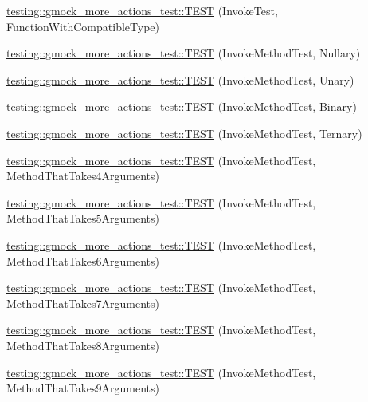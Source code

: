 \begin{DoxyCompactItemize}
\item 
\hyperlink{namespacetesting_1_1gmock__more__actions__test_af9dfd7f1d4186ee4de2d9871a19dba5a}{testing\+::gmock\+\_\+more\+\_\+actions\+\_\+test\+::\+T\+E\+ST} (Invoke\+Test, Function\+With\+Compatible\+Type)
\item 
\hyperlink{namespacetesting_1_1gmock__more__actions__test_abb046fd809977722720c9ce63afd7af5}{testing\+::gmock\+\_\+more\+\_\+actions\+\_\+test\+::\+T\+E\+ST} (Invoke\+Method\+Test, Nullary)
\item 
\hyperlink{namespacetesting_1_1gmock__more__actions__test_a386ce48f1f0a49e2b94a16deeffc2084}{testing\+::gmock\+\_\+more\+\_\+actions\+\_\+test\+::\+T\+E\+ST} (Invoke\+Method\+Test, Unary)
\item 
\hyperlink{namespacetesting_1_1gmock__more__actions__test_a86221fa7d09853358e38c01b0d6ceced}{testing\+::gmock\+\_\+more\+\_\+actions\+\_\+test\+::\+T\+E\+ST} (Invoke\+Method\+Test, Binary)
\item 
\hyperlink{namespacetesting_1_1gmock__more__actions__test_a2b98a8a68d37a0bec600227372a1cff8}{testing\+::gmock\+\_\+more\+\_\+actions\+\_\+test\+::\+T\+E\+ST} (Invoke\+Method\+Test, Ternary)
\item 
\hyperlink{namespacetesting_1_1gmock__more__actions__test_af0ab6ef9fdf48e8442a5579ab27eb517}{testing\+::gmock\+\_\+more\+\_\+actions\+\_\+test\+::\+T\+E\+ST} (Invoke\+Method\+Test, Method\+That\+Takes4\+Arguments)
\item 
\hyperlink{namespacetesting_1_1gmock__more__actions__test_a512db122c5beadeeef026bb54aec7e45}{testing\+::gmock\+\_\+more\+\_\+actions\+\_\+test\+::\+T\+E\+ST} (Invoke\+Method\+Test, Method\+That\+Takes5\+Arguments)
\item 
\hyperlink{namespacetesting_1_1gmock__more__actions__test_a715c088109e141aa577e497e3729b98b}{testing\+::gmock\+\_\+more\+\_\+actions\+\_\+test\+::\+T\+E\+ST} (Invoke\+Method\+Test, Method\+That\+Takes6\+Arguments)
\item 
\hyperlink{namespacetesting_1_1gmock__more__actions__test_a1f11171c55d049143c980502213e0b11}{testing\+::gmock\+\_\+more\+\_\+actions\+\_\+test\+::\+T\+E\+ST} (Invoke\+Method\+Test, Method\+That\+Takes7\+Arguments)
\item 
\hyperlink{namespacetesting_1_1gmock__more__actions__test_a5bfedd2255bbfe7ffcbc76ec581b2ff6}{testing\+::gmock\+\_\+more\+\_\+actions\+\_\+test\+::\+T\+E\+ST} (Invoke\+Method\+Test, Method\+That\+Takes8\+Arguments)
\item 
\hyperlink{namespacetesting_1_1gmock__more__actions__test_acdcc7f6a35e6373f3d0b3a71f98c418b}{testing\+::gmock\+\_\+more\+\_\+actions\+\_\+test\+::\+T\+E\+ST} (Invoke\+Method\+Test, Method\+That\+Takes9\+Arguments)

\end{DoxyCompactItemize}
